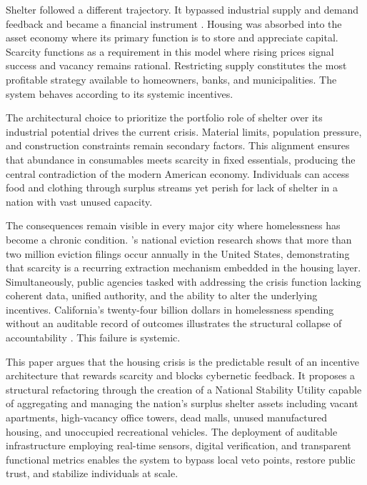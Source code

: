\documentclass[12pt, letterpaper]{article}
\begin{document}
Shelter followed a different trajectory. It bypassed industrial supply and demand feedback and became a financial instrument \citep{aalbers_2016}. Housing was absorbed into the asset economy where its primary function is to store and appreciate capital. Scarcity functions as a requirement in this model where rising prices signal success and vacancy remains rational. Restricting supply constitutes the most profitable strategy available to homeowners, banks, and municipalities. The system behaves according to its systemic incentives.

The architectural choice to prioritize the portfolio role of shelter over its industrial potential drives the current crisis. Material limits, population pressure, and construction constraints remain secondary factors. This alignment ensures that abundance in consumables meets scarcity in fixed essentials, producing the central contradiction of the modern American economy. Individuals can access food and clothing through surplus streams yet perish for lack of shelter in a nation with vast unused capacity.

The consequences remain visible in every major city where homelessness has become a chronic condition. \citet{desmond_2016}'s national eviction research shows that more than two million eviction filings occur annually in the United States, demonstrating that scarcity is a recurring extraction mechanism embedded in the housing layer. Simultaneously, public agencies tasked with addressing the crisis function lacking coherent data, unified authority, and the ability to alter the underlying incentives. California's twenty-four billion dollars in homelessness spending without an auditable record of outcomes illustrates the structural collapse of accountability \citep{ca_state_auditor_2024}. This failure is systemic.

This paper argues that the housing crisis is the predictable result of an incentive architecture that rewards scarcity and blocks cybernetic feedback. It proposes a structural refactoring through the creation of a National Stability Utility capable of aggregating and managing the nation's surplus shelter assets including vacant apartments, high-vacancy office towers, dead malls, unused manufactured housing, and unoccupied recreational vehicles. The deployment of auditable infrastructure employing real-time sensors, digital verification, and transparent functional metrics enables the system to bypass local veto points, restore public trust, and stabilize individuals at scale.
\end{document}
